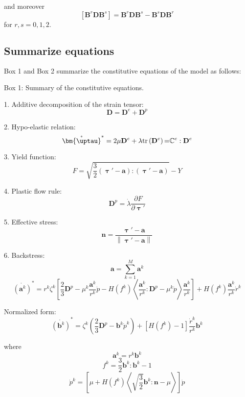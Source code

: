 and moreover
\begin{equation}
\left[ {{{\mathbf{B}}^r}{\mathbf{D}}{{\mathbf{B}}^s}} \right] = {{\mathbf{B}}^r}{\mathbf{D}}{{\mathbf{B}}^s} - {{\mathbf{B}}^s}{\mathbf{D}}{{\mathbf{B}}^r}
\end{equation}
for $r,s = 0,1,2$.
\subsection{Summarize equations}
Box 1 and Box 2 summarize the constitutive equations of the model as follows:
\begin{framed}
\label{Box:1}
Box 1: Summary of the constitutive equations.

1. Additive decomposition of the strain tensor:
\[{\mathbf{D}} = {{\mathbf{D}}^e} + {{\mathbf{D}}^p}\]

2. Hypo-elastic relation:
\[{\mathring {\bm{\uptau }}^{*}} = 2\mu {{\mathbf{D}}^e} + \lambda {\rm{tr}}\left( {{{\mathbf{D}}^e}} \right){\rm{ = }}{\mathbb{C}^e}:{{\mathbf{D}}^e}\]

3. Yield function:
\[F = \sqrt {\frac{3}{2}\left( {{\bm{\uptau}}' - {\mathbf{a}}} \right):\left( {{\bm{\uptau}}' - {\mathbf{a}}} \right)}  - Y\]

4. Plastic flow rule:
\[{{{\mathbf{D}}^p}} = \dot \lambda \frac{{\partial F}}{{\partial {\bm{\uptau }'}}}\]

5. Effective stress:
\[{\mathbf{n}} = \frac{{{\bm{\uptau}}' - {\mathbf{a}}}}{{\left\| {{\bm{\uptau}}' - {\mathbf{a}}} \right\|}}\]

6. Backstress:
\[{\mathbf{a}} = \sum\limits_{k = 1}^M {{{\mathbf{a}}^k}} \]
\[\mathring{\left({\mathbf{a}}^{k}\right)}^* = {r^k}{\zeta ^k}\left[ {\frac{2}{3}{{\mathbf{D}}^p} - {\mu ^k}\frac{{{{\mathbf{a}}^k}}}{{{r^k}}}\dot p - H\left( {{f^k}} \right)\left\langle {\frac{{{{\mathbf{a}}^k}}}{{{r^k}}}:{{\mathbf{D}}^p} - {\mu ^k}\dot p} \right\rangle \frac{{{{\mathbf{a}}^k}}}{{{r^k}}}} \right] + H\left( {{f^k}} \right)\frac{{{{\mathbf{a}}^k}}}{{{r^k}}}{\dot r^k}\]

Normalized form:
\[\mathring{\left({\mathbf{b}}^{k}\right)}^* = {\zeta ^k}\left( {\frac{2}{3}{{\mathbf{D}}^p} - {{\mathbf{b}}^k}{{\dot p}^k}} \right) + \left[ {H\left( {{f^k}} \right) - 1} \right]\frac{{{{\dot r}^k}}}{{{r^k}}}{{\mathbf{b}}^k}\]

where
\[{{\mathbf{a}}^k} = {r^k}{{\mathbf{b}}^k}\]
\[{f^k} = \frac{3}{2}{{\mathbf{b}}^k}:{{\mathbf{b}}^k} - 1\]
\[{\dot p^k} = \left[ {\mu  + H\left( {{f^k}} \right)\left\langle {\sqrt {\frac{3}{2}} {{\mathbf{b}}^k}:{\mathbf{n}} - \mu } \right\rangle } \right]\dot p\]
\end{framed}


